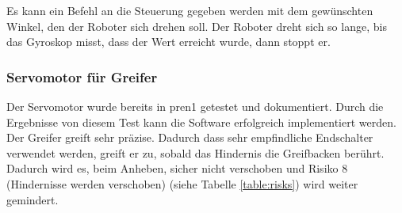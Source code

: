 Es kann ein Befehl an die Steuerung gegeben werden mit dem gewünschten Winkel, den der Roboter sich drehen soll. Der Roboter dreht sich so lange, bis das Gyroskop misst, dass der Wert erreicht wurde, dann stoppt er.


\subsubsection{Servomotor für Greifer} 
\label{hindernis-um-greifer}

Der Servomotor wurde bereits in \acrshort{pren1} getestet und dokumentiert. Durch die Ergebnisse von diesem Test kann die Software erfolgreich implementiert werden. Der Greifer greift sehr präzise. Dadurch dass sehr empfindliche Endschalter verwendet werden, greift er zu, sobald das Hindernis die Greifbacken berührt. Dadurch wird es, beim Anheben, sicher nicht verschoben und Risiko 8 (Hindernisse werden verschoben) (siehe Tabelle \ref{table:risks}) wird weiter gemindert.


